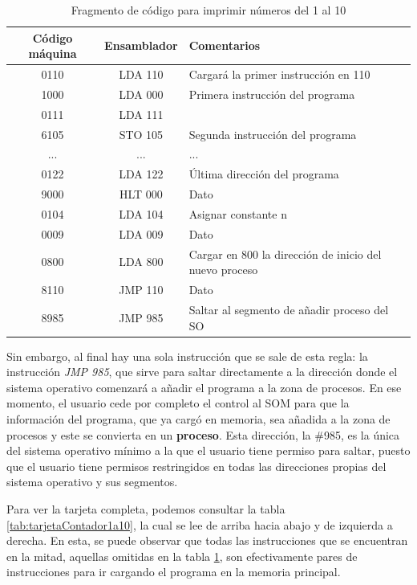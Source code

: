 \documentclass[letterpaper,12pt,oneside]{book}
\begin{document}
		\begin{table}[h]
			  \centering
			  \begin{tabular}{|c|c|p{8cm}|}
			    \hline
		    	\textbf{Código máquina} & \textbf{Ensamblador} & \textbf{Comentarios} \\
			    \hline
				0110  & LDA 110 & Cargará la primer instrucción en 110 \\
				\hline
				1000 & LDA 000 & Primera instrucción del programa \\
				\hline
				0111 & LDA 111 & \\
				\hline
				6105 & STO 105 & Segunda instrucción del programa \\
				\hline
				...&...&... \\
 				\hline
				0122 & LDA 122 & Última dirección del programa \\
				\hline
				9000 & HLT 000 & Dato \\
				\hline
				0104 & LDA 104 & Asignar constante n \\
				\hline
				0009 & LDA 009 & Dato \\
				\hline
				0800 & LDA 800 & Cargar en 800 la dirección de inicio del nuevo proceso \\
				\hline
				8110 &  JMP 110 & Dato \\
				\hline
				8985 & JMP 985 & Saltar al segmento de añadir proceso del SO \\
				\hline
			  \end{tabular}
			  \caption{Fragmento de código  para imprimir números del 1 al 10}
			  \label{tab:fragmentoContador1a10}
			\end{table}
  
        Sin embargo, al final hay una sola instrucción que se sale de esta regla:
        la instrucción \textit{JMP 985}, que sirve para saltar directamente a la dirección
		donde el sistema operativo comenzará a añadir el programa a la zona de procesos. En ese momento, el usuario cede por completo el control
		al SOM para que la información del programa, que ya cargó en memoria, sea añadida a la zona de procesos y este se convierta en un 
		\textbf{proceso}. 
		Esta dirección, la \#985, es la única del sistema operativo mínimo a la que el usuario tiene permiso para saltar, puesto
		que el usuario tiene permisos restringidos en todas las direcciones propias del sistema operativo y sus segmentos.
		
		Para ver la tarjeta completa, podemos consultar la tabla \ref{tab:tarjetaContador1a10}, la cual se lee de arriba hacia abajo y de
		izquierda a derecha. En esta, se puede observar que todas las 
		instrucciones
		que se encuentran en la mitad, aquellas omitidas en la tabla \ref{tab:fragmentoContador1a10}, son efectivamente pares de instrucciones para ir 
		cargando el 
		programa en la memoria principal.
				
\end{document}
